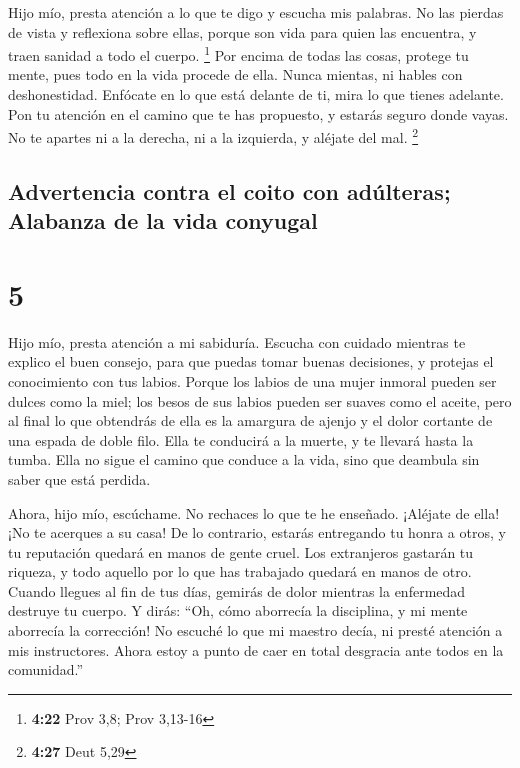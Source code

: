  Hijo mío, presta atención a lo que te digo y escucha mis
palabras.  No las pierdas de vista y reflexiona sobre
ellas,  porque son vida para quien las encuentra, y traen
sanidad a todo el cuerpo. \footnote{\textbf{4:22} Prov 3,8; Prov 3,13-16}
 Por encima de todas las cosas, protege tu mente, pues todo
en la vida procede de ella.  Nunca mientas, ni hables con
deshonestidad.  Enfócate en lo que está delante de ti, mira
lo que tienes adelante.  Pon tu atención en el camino que
te has propuesto, y estarás seguro donde vayas.  No te
apartes ni a la derecha, ni a la izquierda, y aléjate del mal.
\footnote{\textbf{4:27} Deut 5,29}

\hypertarget{advertencia-contra-el-coito-con-aduxfalteras-alabanza-de-la-vida-conyugal}{%
\subsection{Advertencia contra el coito con adúlteras; Alabanza de la
vida
conyugal}\label{advertencia-contra-el-coito-con-aduxfalteras-alabanza-de-la-vida-conyugal}}

\hypertarget{section-4}{%
\section{5}\label{section-4}}

 Hijo mío, presta atención a mi sabiduría. Escucha con
cuidado mientras te explico el buen consejo,  para que
puedas tomar buenas decisiones, y protejas el conocimiento con tus
labios.  Porque los labios de una mujer inmoral pueden ser
dulces como la miel; los besos de sus labios pueden ser suaves como el
aceite,  pero al final lo que obtendrás de ella es la
amargura de ajenjo y el dolor cortante de una espada de doble filo.
 Ella te conducirá a la muerte, y te llevará hasta la tumba.
 Ella no sigue el camino que conduce a la vida, sino que
deambula sin saber que está perdida.

 Ahora, hijo mío, escúchame. No rechaces lo que te he
enseñado.  ¡Aléjate de ella! ¡No te acerques a su casa!
 De lo contrario, estarás entregando tu honra a otros, y tu
reputación quedará en manos de gente cruel.  Los
extranjeros gastarán tu riqueza, y todo aquello por lo que has trabajado
quedará en manos de otro.  Cuando llegues al fin de tus
días, gemirás de dolor mientras la enfermedad destruye tu cuerpo.
 Y dirás: ``Oh, cómo aborrecía la disciplina, y mi mente
aborrecía la corrección!  No escuché lo que mi maestro
decía, ni presté atención a mis instructores.  Ahora estoy
a punto de caer en total desgracia ante todos en la comunidad.''

